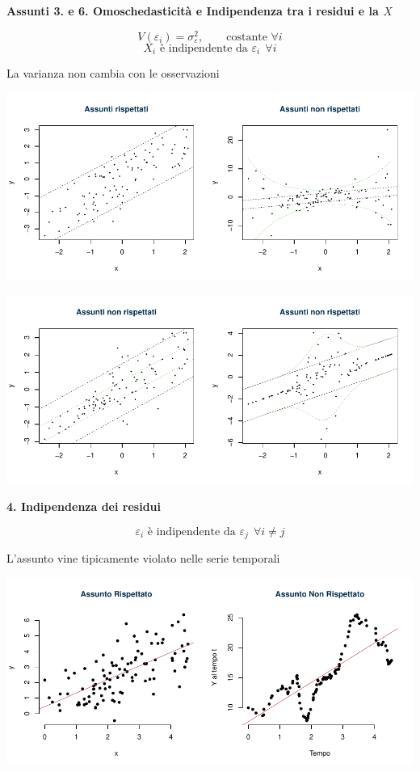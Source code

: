 \documentclass[
  11pt,
]{book}
\theoremstyle{mytheoremstyle}
\theoremstyle{mydefstyle}
\begin{document}
\textbf{Assunti 3. e 6. Omoschedasticità e Indipendenza tra i residui e la \(X\)}

\[V(\varepsilon_{i}) = \sigma_\varepsilon^2,\qquad \text{costante }\forall i\]
\[X_i\text{ è indipendente da }\varepsilon_i~~\forall i\]

La varianza non cambia con le osservazioni

\begin{center}\includegraphics{Appunti_di_Statistica_2025_files/figure-latex/17-regressione-I-23-1} \end{center}

\begin{center}\includegraphics{Appunti_di_Statistica_2025_files/figure-latex/17-regressione-I-24-1} \end{center}

\textbf{4. Indipendenza dei residui}

\[\varepsilon_i\text{ è indipendente da }\varepsilon_j~~\forall i\neq j\]

L'assunto vine tipicamente violato nelle serie temporali

\begin{center}\includegraphics{Appunti_di_Statistica_2025_files/figure-latex/17-regressione-I-26-1} \end{center}
\end{document}
